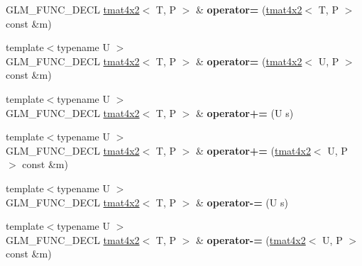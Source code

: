\begin{DoxyCompactItemize}
\item 
\hypertarget{structglm_1_1detail_1_1tmat4x2_a540bb35dcfe3e71b82c4abccca943cd2}{G\-L\-M\-\_\-\-F\-U\-N\-C\-\_\-\-D\-E\-C\-L \hyperlink{structglm_1_1detail_1_1tmat4x2}{tmat4x2}$<$ T, P $>$ \& {\bfseries operator=} (\hyperlink{structglm_1_1detail_1_1tmat4x2}{tmat4x2}$<$ T, P $>$ const \&m)}\label{structglm_1_1detail_1_1tmat4x2_a540bb35dcfe3e71b82c4abccca943cd2}

\item 
\hypertarget{structglm_1_1detail_1_1tmat4x2_a520ecb4fc8ff7b87e517db74d07678a7}{{\footnotesize template$<$typename U $>$ }\\G\-L\-M\-\_\-\-F\-U\-N\-C\-\_\-\-D\-E\-C\-L \hyperlink{structglm_1_1detail_1_1tmat4x2}{tmat4x2}$<$ T, P $>$ \& {\bfseries operator=} (\hyperlink{structglm_1_1detail_1_1tmat4x2}{tmat4x2}$<$ U, P $>$ const \&m)}\label{structglm_1_1detail_1_1tmat4x2_a520ecb4fc8ff7b87e517db74d07678a7}

\item 
\hypertarget{structglm_1_1detail_1_1tmat4x2_afc1384cd2981f135bf21be4f2405298d}{{\footnotesize template$<$typename U $>$ }\\G\-L\-M\-\_\-\-F\-U\-N\-C\-\_\-\-D\-E\-C\-L \hyperlink{structglm_1_1detail_1_1tmat4x2}{tmat4x2}$<$ T, P $>$ \& {\bfseries operator+=} (U s)}\label{structglm_1_1detail_1_1tmat4x2_afc1384cd2981f135bf21be4f2405298d}

\item 
\hypertarget{structglm_1_1detail_1_1tmat4x2_a65939b2c728dde98658056e9f1e68b2a}{{\footnotesize template$<$typename U $>$ }\\G\-L\-M\-\_\-\-F\-U\-N\-C\-\_\-\-D\-E\-C\-L \hyperlink{structglm_1_1detail_1_1tmat4x2}{tmat4x2}$<$ T, P $>$ \& {\bfseries operator+=} (\hyperlink{structglm_1_1detail_1_1tmat4x2}{tmat4x2}$<$ U, P $>$ const \&m)}\label{structglm_1_1detail_1_1tmat4x2_a65939b2c728dde98658056e9f1e68b2a}

\item 
\hypertarget{structglm_1_1detail_1_1tmat4x2_aa29ebe7a63b94a6313746b46e249bbab}{{\footnotesize template$<$typename U $>$ }\\G\-L\-M\-\_\-\-F\-U\-N\-C\-\_\-\-D\-E\-C\-L \hyperlink{structglm_1_1detail_1_1tmat4x2}{tmat4x2}$<$ T, P $>$ \& {\bfseries operator-\/=} (U s)}\label{structglm_1_1detail_1_1tmat4x2_aa29ebe7a63b94a6313746b46e249bbab}

\item 
\hypertarget{structglm_1_1detail_1_1tmat4x2_a1090317fd177133e27ad3aeeb38d931b}{{\footnotesize template$<$typename U $>$ }\\G\-L\-M\-\_\-\-F\-U\-N\-C\-\_\-\-D\-E\-C\-L \hyperlink{structglm_1_1detail_1_1tmat4x2}{tmat4x2}$<$ T, P $>$ \& {\bfseries operator-\/=} (\hyperlink{structglm_1_1detail_1_1tmat4x2}{tmat4x2}$<$ U, P $>$ const \&m)}\label{structglm_1_1detail_1_1tmat4x2_a1090317fd177133e27ad3aeeb38d931b}


\end{DoxyCompactItemize}
